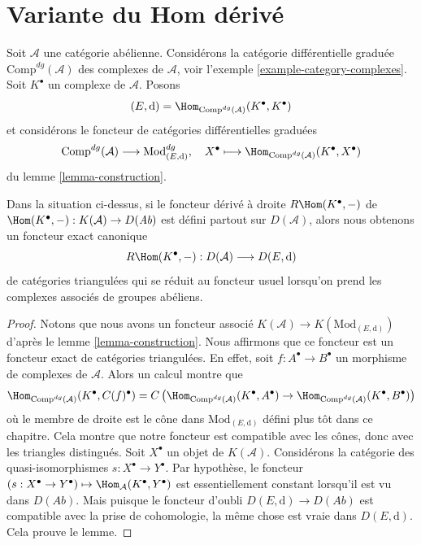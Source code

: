 \section{Variante du Hom dérivé}
\label{section-variant}

\noindent
Soit $\mathcal{A}$ une catégorie abélienne. Considérons la catégorie
différentielle graduée $\text{Comp}^{dg}(\mathcal{A})$ des complexes de $\mathcal{A}$, voir
l'exemple \ref{example-category-complexes}.
Soit $K^\bullet$ un complexe de $\mathcal{A}$. Posons
$$
(E, \text{d}) = \Hom_{\text{Comp}^{dg}(\mathcal{A})}(K^\bullet, K^\bullet)
$$
et considérons le foncteur de catégories différentielles graduées
$$
\text{Comp}^{dg}(\mathcal{A}) \longrightarrow \text{Mod}^{dg}_{(E, \text{d})},
\quad
X^\bullet
\longmapsto
\Hom_{\text{Comp}^{dg}(\mathcal{A})}(K^\bullet, X^\bullet)
$$
du lemme \ref{lemma-construction}.

\begin{lemma}
\label{lemma-existence-of-derived}
Dans la situation ci-dessus, si le foncteur dérivé à droite $R\Hom(K^\bullet,
-)$ de $\Hom(K^\bullet, -) : K(\mathcal{A}) \to D(\textit{Ab})$
est défini partout sur $D(\mathcal{A})$, alors nous obtenons un foncteur exact
canonique
$$
R\Hom(K^\bullet, -) : D(\mathcal{A}) \longrightarrow D(E, \text{d})
$$
de catégories triangulées qui se réduit au foncteur usuel lorsqu'on prend
les complexes associés de groupes abéliens.
\end{lemma}

\begin{proof}
Notons que nous avons un foncteur associé
$K(\mathcal{A}) \to K(\text{Mod}_{(E, \text{d})})$ d'après
le lemme \ref{lemma-construction}.
Nous affirmons que ce foncteur est un foncteur exact de catégories
triangulées. En effet, soit $f : A^\bullet \to B^\bullet$ un morphisme de
complexes de $\mathcal{A}$. Alors un calcul montre que
$$
\Hom_{\text{Comp}^{dg}(\mathcal{A})}(K^\bullet, C(f)^\bullet)
=
C\left(
\Hom_{\text{Comp}^{dg}(\mathcal{A})}(K^\bullet, A^\bullet) \to
\Hom_{\text{Comp}^{dg}(\mathcal{A})}(K^\bullet, B^\bullet)
\right)
$$
où le membre de droite est le cône dans $\text{Mod}_{(E, \text{d})}$
défini plus tôt dans ce chapitre. Cela
montre que notre foncteur est compatible avec les cônes, donc avec
les triangles distingués. Soit $X^\bullet$ un objet de $K(\mathcal{A})$.
Considérons la catégorie des quasi-isomorphismes $s : X^\bullet \to Y^\bullet$. Par
hypothèse, le foncteur $(s :
X^\bullet \to Y^\bullet) \mapsto \Hom_\mathcal{A}(K^\bullet, Y^\bullet)$ est
essentiellement constant lorsqu'il est vu dans $D(\textit{Ab})$. Mais
puisque le foncteur d'oubli $D(E, \text{d}) \to D(\textit{Ab})$ est
compatible avec la prise de cohomologie, la même chose est vraie dans $D(E,
\text{d})$. Cela prouve le lemme.
\end{proof}

